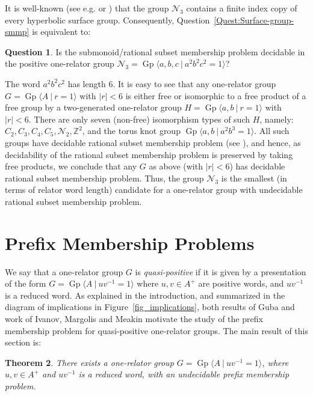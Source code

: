 \documentclass{amsart}
\newcommand{\Gpres}[2]{\operatorname{Gp}\bigl\langle #1\:|\:#2 \bigr\rangle}
\newcommand{\Z}{\mathbb{Z}}
\theoremstyle{plain}
\newtheorem{theorem}{Theorem}[section]
\theoremstyle{definition}
\newtheorem{question}[theorem]{Question}
\begin{document}
It is well-known (see e.g. \cite[\S4.3.7]{Stillwell1993} or \cite{Hoare1971}) that the group $\mathcal{N}_3$ contains a finite index copy of every hyperbolic surface group. Consequently, Question~\ref{Quest:Surface-group-smmp} is equivalent to:

\begin{question}\label{Quest:SMMP-in-N3}
Is the submonoid/rational subset membership problem decidable in the positive one-relator group $\mathcal{N}_3 = \Gpres{a,b,c}{a^2b^2c^2=1}$?
\end{question}

The word $a^2b^2c^2$ has length $6$. It is easy to see that any one-relator group $G = \Gpres{A}{r=1}$ with $|r| < 6$ is either free or isomorphic to a free product of a free group by a two-generated one-relator group $H = \Gpres{a,b}{r=1}$ with $|r| < 6$. There are only seven (non-free) isomorphism types of such $H$, namely: $C_2, C_3, C_4, C_5, \mathcal{N}_2, \Z^2$, and the torus knot group $\Gpres{a,b}{a^2b^3=1}$. All such groups have decidable rational subset membership problem (see \cite{nyberg2022diophantine}), and hence, as decidability of the rational subset membership problem is preserved by taking free products, we conclude that any $G$ as above (with $|r| < 6$) has decidable rational subset membership problem. Thus, the group $\mathcal{N}_3$ is the smallest (in terms of relator word length) candidate for a one-relator group with undecidable rational subset membership problem. 


\section{Prefix Membership Problems}\label{Sec:prefix-membership-problem}

We say that a one-relator group $G$ is \textit{quasi-positive} if it is given by a presentation of the form $G = \Gpres{A}{uv^{-1}=1}$ where $u, v \in A^+$ are positive words, and $uv^{-1}$ is a reduced word. 
As explained in the introduction, and summarized in the diagram of implications in Figure~\ref{fig_implications}, both results of Guba \cite{Guba1997} and work of Ivanov, Margolis and Meakin \cite{Ivanov2001} motivate the study of the prefix membership problem for quasi-positive one-relator groups.   
The main result of this section is:
\begin{theorem}\label{Thm:exists-quasi-positive-undec-prefix}
There exists a one-relator group 
$G = \Gpres{A}{uv^{-1}=1}$, 
where $u, v \in A^+$ and $uv^{-1}$ is a reduced word, 
with an undecidable prefix membership problem. 
\end{theorem}
\end{document}
